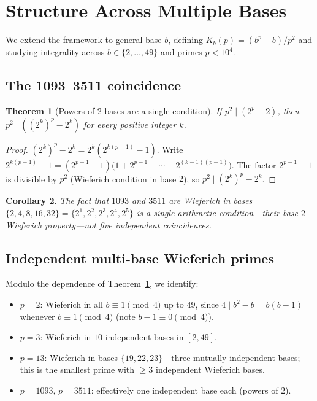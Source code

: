 \documentclass[12pt,a4paper]{article}
\newtheorem{theorem}{Theorem}[section]
\newtheorem{corollary}[theorem]{Corollary}
\theoremstyle{definition}
\theoremstyle{remark}
\begin{document}
\section{Structure Across Multiple Bases}
\label{sec:multibases}

We extend the framework to general base $b$, defining
$K_b(p) = (b^p - b)/p^2$ and studying integrality across
$b \in \{2,\ldots,49\}$ and primes $p < 10^4$.

\subsection{The 1093--3511 coincidence}

\begin{theorem}[Powers-of-2 bases are a single condition]
\label{thm:powers}
If $p^2 \mid (2^p - 2)$, then $p^2 \mid ((2^k)^p - 2^k)$ for every
positive integer $k$.
\end{theorem}

\begin{proof}
$(2^k)^p - 2^k = 2^k(2^{k(p-1)}-1)$.
Write $2^{k(p-1)}-1 = (2^{p-1}-1)\bigl(1 + 2^{p-1} + \cdots +
2^{(k-1)(p-1)}\bigr)$. The factor $2^{p-1}-1$ is divisible by $p^2$
(Wieferich condition in base $2$), so $p^2 \mid (2^k)^p - 2^k$.
\end{proof}

\begin{corollary}
The fact that $1093$ and $3511$ are Wieferich in bases
$\{2,4,8,16,32\} = \{2^1,2^2,2^3,2^4,2^5\}$ is a \emph{single}
arithmetic condition---their base-$2$ Wieferich property---not five
independent coincidences.
\end{corollary}

\subsection{Independent multi-base Wieferich primes}

Modulo the dependence of Theorem~\ref{thm:powers}, we identify:

\begin{itemize}
  \item $p = 2$: Wieferich in all $b \equiv 1 \pmod{4}$ up to $49$,
        since $4 \mid b^2 - b = b(b-1)$ whenever $b \equiv 1\pmod{4}$
        (note $b-1 \equiv 0 \pmod 4$).
  \item $p = 3$: Wieferich in $10$ independent bases in $[2,49]$.
  \item $p = 13$: Wieferich in bases $\{19, 22, 23\}$---three mutually
        independent bases; this is the smallest prime with $\ge 3$
        independent Wieferich bases.
  \item $p = 1093$, $p = 3511$: effectively one independent base each
        (powers of $2$).
\end{itemize}
\end{document}
